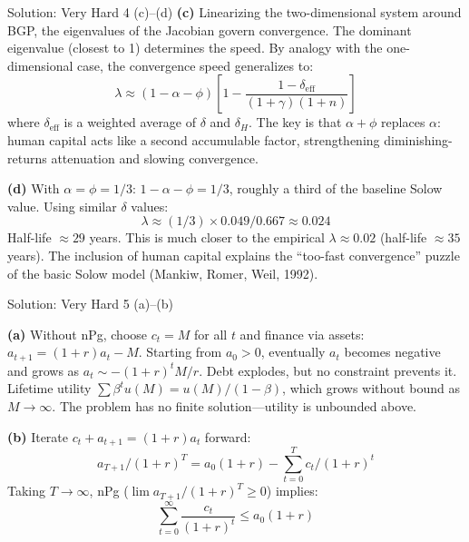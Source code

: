 \documentclass[aspectratio=169,10pt]{beamer}
\newcommand{\backbutton}[1]{\hfill\hyperlink{#1}{\beamerbutton{Back}}}
\begin{document}
\begin{frame}{Solution: Very Hard 4 (c)--(d)}
\textbf{(c)} Linearizing the two-dimensional system around BGP, the eigenvalues of the Jacobian govern convergence. The dominant eigenvalue (closest to 1) determines the speed. By analogy with the one-dimensional case, the convergence speed generalizes to:
\[
\lambda \approx (1-\alpha-\phi)\left[1-\frac{1-\delta_{\text{eff}}}{(1+\gamma)(1+n)}\right]
\]
where $\delta_{\text{eff}}$ is a weighted average of $\delta$ and $\delta_H$. The key is that $\alpha+\phi$ replaces $\alpha$: human capital acts like a second accumulable factor, strengthening diminishing-returns attenuation and slowing convergence.

\medskip
\textbf{(d)} With $\alpha=\phi=1/3$: $1-\alpha-\phi = 1/3$, roughly a third of the baseline Solow value. Using similar $\delta$ values:
\[
\lambda \approx (1/3)\times 0.049/0.667 \approx 0.024
\]
Half-life $\approx 29$ years. This is much closer to the empirical $\lambda\approx 0.02$ (half-life $\approx 35$ years). The inclusion of human capital explains the ``too-fast convergence'' puzzle of the basic Solow model (Mankiw, Romer, Weil, 1992).
\backbutton{q-v4}
\end{frame}

\begin{frame}{Solution: Very Hard 5 (a)--(b)}
\hypertarget{s-v5}{}

\textbf{(a)} Without nPg, choose $c_t = M$ for all $t$ and finance via assets: $a_{t+1} = (1+r)a_t - M$. Starting from $a_0>0$, eventually $a_t$ becomes negative and grows as $a_t \sim -(1+r)^t M/r$. Debt explodes, but no constraint prevents it. Lifetime utility $\sum\beta^t u(M) = u(M)/(1-\beta)$, which grows without bound as $M\to\infty$. The problem has no finite solution---utility is unbounded above.

\medskip
\textbf{(b)} Iterate $c_t + a_{t+1} = (1+r)a_t$ forward:
\[
a_{T+1}/(1+r)^T = a_0(1+r) - \sum_{t=0}^{T}c_t/(1+r)^t
\]
Taking $T\to\infty$, nPg ($\lim a_{T+1}/(1+r)^T \geq 0$) implies:
\[
\sum_{t=0}^{\infty}\frac{c_t}{(1+r)^t} \leq a_0(1+r)
\]
\end{frame}
\end{document}
